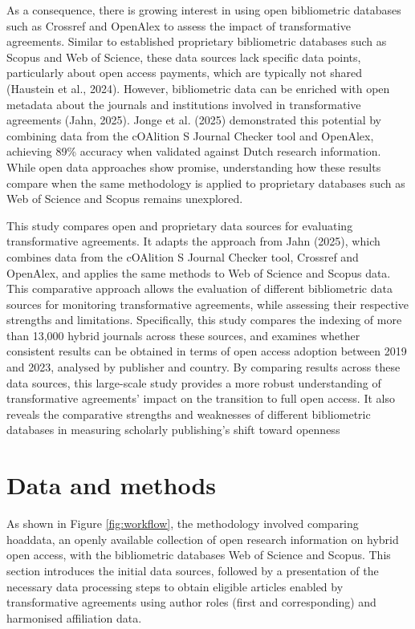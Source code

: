\documentclass[a4paper,man,floatsintext,longtable,noextraspace,10pt]{apa6}
\begin{document}
As a consequence, there is growing interest in using open bibliometric
databases such as Crossref and OpenAlex to assess the impact of
transformative agreements. Similar to established proprietary
bibliometric databases such as Scopus and Web of Science, these data
sources lack specific data points, particularly about open access
payments, which are typically not shared (Haustein et al., 2024).
However, bibliometric data can be enriched with open metadata about the
journals and institutions involved in transformative agreements (Jahn,
2025). Jonge et al. (2025) demonstrated this potential by combining data
from the cOAlition S Journal Checker tool and OpenAlex, achieving 89\%
accuracy when validated against Dutch research information. While open
data approaches show promise, understanding how these results compare
when the same methodology is applied to proprietary databases such as
Web of Science and Scopus remains unexplored.

This study compares open and proprietary data sources for evaluating
transformative agreements. It adapts the approach from Jahn (2025),
which combines data from the cOAlition S Journal Checker tool, Crossref
and OpenAlex, and applies the same methods to Web of Science and Scopus
data. This comparative approach allows the evaluation of different
bibliometric data sources for monitoring transformative agreements,
while assessing their respective strengths and limitations.
Specifically, this study compares the indexing of more than 13,000
hybrid journals across these sources, and examines whether consistent
results can be obtained in terms of open access adoption between 2019
and 2023, analysed by publisher and country. By comparing results across
these data sources, this large-scale study provides a more robust
understanding of transformative agreements' impact on the transition to
full open access. It also reveals the comparative strengths and
weaknesses of different bibliometric databases in measuring scholarly
publishing's shift toward openness

\section{Data and methods}\label{data-and-methods}

As shown in Figure \ref{fig:workflow}, the methodology involved
comparing hoaddata, an openly available collection of open research
information on hybrid open access, with the bibliometric databases Web
of Science and Scopus. This section introduces the initial data sources,
followed by a presentation of the necessary data processing steps to
obtain eligible articles enabled by transformative agreements using
author roles (first and corresponding) and harmonised affiliation data.
\end{document}
